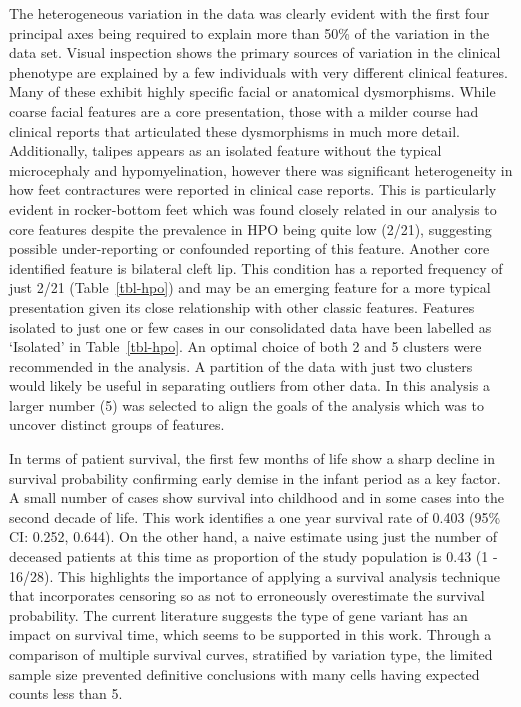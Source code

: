 \documentclass[
  letterpaper,
  DIV=11,
  numbers=noendperiod]{scrartcl}
\begin{document}
The heterogeneous variation in the data was clearly evident with the
first four principal axes being required to explain more than 50\% of
the variation in the data set. Visual inspection shows the primary
sources of variation in the clinical phenotype are explained by a few
individuals with very different clinical features. Many of these exhibit
highly specific facial or anatomical dysmorphisms. While coarse facial
features are a core presentation, those with a milder course had
clinical reports that articulated these dysmorphisms in much more
detail. Additionally, talipes appears as an isolated feature without the
typical microcephaly and hypomyelination, however there was significant
heterogeneity in how feet contractures were reported in clinical case
reports. This is particularly evident in rocker-bottom feet which was
found closely related in our analysis to core features despite the
prevalence in HPO being quite low (2/21), suggesting possible
under-reporting or confounded reporting of this feature. Another core
identified feature is bilateral cleft lip. This condition has a reported
frequency of just 2/21 (Table~\ref{tbl-hpo}) and may be an emerging
feature for a more typical presentation given its close relationship
with other classic features. Features isolated to just one or few cases
in our consolidated data have been labelled as `Isolated' in
Table~\ref{tbl-hpo}. An optimal choice of both 2 and 5 clusters were
recommended in the analysis. A partition of the data with just two
clusters would likely be useful in separating outliers from other data.
In this analysis a larger number (5) was selected to align the goals of
the analysis which was to uncover distinct groups of features.

In terms of patient survival, the first few months of life show a sharp
decline in survival probability confirming early demise in the infant
period as a key factor. A small number of cases show survival into
childhood and in some cases into the second decade of life. This work
identifies a one year survival rate of 0.403 (95\% CI: 0.252, 0.644). On
the other hand, a naive estimate using just the number of deceased
patients at this time as proportion of the study population is 0.43 (1 -
16/28). This highlights the importance of applying a survival analysis
technique that incorporates censoring so as not to erroneously
overestimate the survival probability. The current literature suggests
the type of gene variant has an impact on survival time, which seems to
be supported in this work. Through a comparison of multiple survival
curves, stratified by variation type, the limited sample size prevented
definitive conclusions with many cells having expected counts less than
5.
\end{document}
